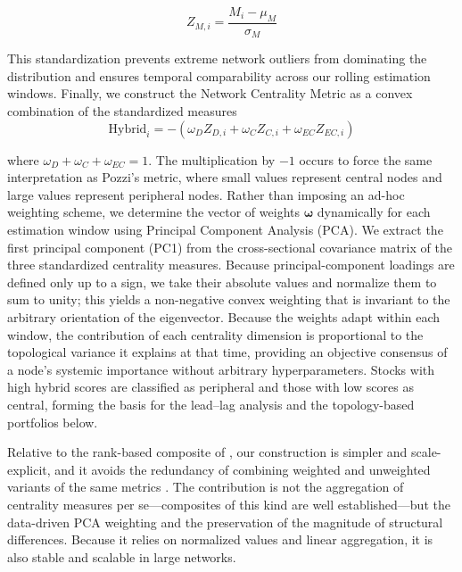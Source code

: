 \documentclass[fleqn]{rbfin}
\begin{document}
\begin{equation}
    Z_{M,i} = \frac{M_i - \mu_M}{\sigma_M}
\end{equation}

\noindent This standardization prevents extreme network outliers from dominating the distribution and ensures temporal comparability across our rolling estimation windows. Finally, we construct the Network Centrality Metric as a convex combination of the standardized measures 
\begin{equation}
    \text{Hybrid}_i = -(\omega_D Z_{D,i} + \omega_C Z_{C,i} + \omega_{EC} Z_{EC,i})
\end{equation}

\noindent where $\omega_D + \omega_C + \omega_{EC} = 1$. The multiplication by $-1$ occurs to force the same interpretation as Pozzi's metric, where small values represent central nodes and large values represent peripheral nodes. Rather than imposing an ad-hoc weighting scheme, we determine the vector of weights $\boldsymbol{\omega}$ dynamically for each estimation window using Principal Component Analysis (PCA). We extract the first principal component (PC1) from the cross-sectional covariance matrix of the three standardized centrality measures. Because principal-component loadings are defined only up to a sign, we take their absolute values and normalize them to sum to unity; this yields a non-negative convex weighting that is invariant to the arbitrary orientation of the eigenvector. Because the weights adapt within each window, the contribution of each centrality dimension is proportional to the topological variance it explains at that time, providing an objective consensus of a node's systemic importance without arbitrary hyperparameters. Stocks with high hybrid scores are classified as peripheral and those with low scores as central, forming the basis for the lead--lag analysis and the topology-based portfolios below.

Relative to the rank-based composite of \citet{pozzi2013spread}, our construction is simpler and scale-explicit, and it avoids the redundancy of combining weighted and unweighted variants of the same metrics \citep{Bonacich1972}. The contribution is not the aggregation of centrality measures per se---composites of this kind are well established---but the data-driven PCA weighting and the preservation of the magnitude of structural differences. Because it relies on normalized values and linear aggregation, it is also stable and scalable in large networks.
\end{document}
